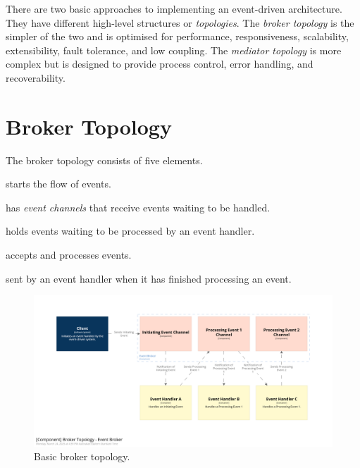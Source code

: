 There are two basic approaches to implementing an event-driven architecture.
They have different high-level structures or \emph{topologies}.
The \emph{broker topology} is the simpler of the two and is optimised for performance, responsiveness, scalability, extensibility, fault tolerance, and low coupling.
The \emph{mediator topology} is more complex but is designed to provide process control, error handling, and recoverability.


\section{Broker Topology}

The broker topology consists of five elements.

\begin{description}[topsep=6pt,partopsep=2pt,itemsep=4pt,parsep=4pt]
    \item[Initiating Event] starts the flow of events.
    \item[Event Broker] has \emph{event channels} that receive events waiting to be handled.
    \item[Event Channel] holds events waiting to be processed by an event handler.
    \item[Event Handler] accepts and processes events.
    \item[Processing Event] sent by an event handler when it has finished processing an event.
\end{description}

\begin{figure}[h!]
    \begin{adjustwidth}{-10mm}{-10mm}
        \centering
        \includegraphics[trim=195 230 195 162,clip,width=0.97\paperwidth]{diagrams/broker-components.png}
    \end{adjustwidth}
    \caption{Basic broker topology.}
    \label{fig:broker-components}
\end{figure}

